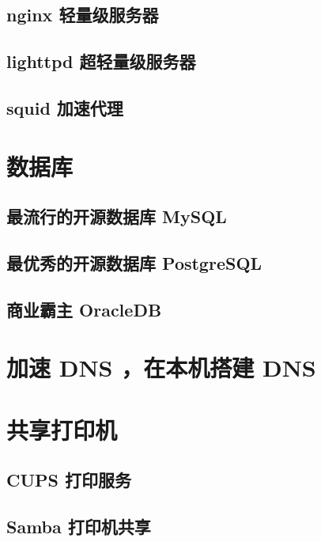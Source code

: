 \subsection{ nginx 轻量级服务器}
\subsection{ lighttpd 超轻量级服务器}
\subsection{ squid 加速代理	}
\section{  数据库	}
\subsection{  最流行的开源数据库 MySQL}
\subsection{  最优秀的开源数据库 PostgreSQL 	}
\subsection{  商业霸主 OracleDB	}
\section{  加速 DNS ，在本机搭建 DNS	}
\section{  共享打印机	}
\subsection{ CUPS 打印服务	}
\subsection{ Samba 打印机共享	}